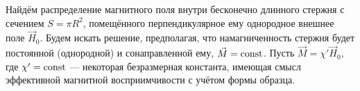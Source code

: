 %
%




%
%

Найдём распределение магнитного поля внутри бесконечно длинного стержня
с сечением $S=\pi R^2$,
помещённого перпендикулярное ему однородное внешнее поле $\vec{H}_0$.
Будем искать решение, предполагая, что намагниченность стержня будет
постоянной (однородной) и сонаправленной ему, $\vec M=\mathrm{const}$. Пусть
$\vec M=\chi' \vec{H}_0$, где
$\chi'=\mathrm{const}$ --- некоторая безразмерная константа, имеющая смысл эффективной
магнитной восприимчивости с учётом формы образца.

